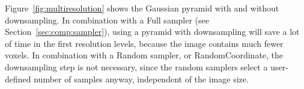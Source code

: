 \documentclass[]{report}
\begin{document}
Figure~\ref{fig:multiresolution} shows the Gaussian pyramid with and
without downsampling. In combination with a Full sampler (see
Section~\ref{sec:comp:sampler}), using a pyramid with downsampling
will save a lot of time in the first resolution levels, because the
image contains much fewer voxels. In combination with a Random
sampler, or RandomCoordinate, the downsampling step is not necessary,
since the random samplers select a user-defined number of samples
anyway, independent of the image size.

\begin{figure}[tb]
\centering {}
 \\

\end{figure}
\end{document}
